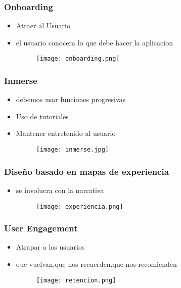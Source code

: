 \documentclass[11pt]{beamer}
\begin{document}
\begin{frame}
\frametitle{Onboarding}
\begin{itemize}
    \item Atraer al Usuario
    \item el usuario conocera lo que debe hacer la aplicacion 
     \begin{figure}
        \texttt{[image: onboarding.png]}
        \label{fig:my_label}
    \end{figure}
\end{itemize}
\end{frame}




\begin{frame}
\frametitle{Inmerse}
\begin{itemize}
    \item debemos usar funciones progresivas 
    \item Uso de tutoriales
    \item Mantener entretenido al usuario
     \begin{figure}
        \texttt{[image: inmerse.jpg]}
        \label{fig:my_label}
    \end{figure}
\end{itemize}
\end{frame}



\begin{frame}
\frametitle{Diseño basado en mapas de experiencia}
\begin{itemize}
    \item se involucra con la narrativa
     \begin{figure}
        \texttt{[image: experiencia.png]}
        \label{fig:my_label}
    \end{figure}
\end{itemize}
\end{frame}




\begin{frame}
\frametitle{User Engagement}
\begin{itemize}
    \item Atrapar a los usuarios
    \item que vuelvan,que nos recuerden,que nos recomienden
    \begin{figure}
        \texttt{[image: retencion.png]}
        \label{fig:my_label}
    \end{figure}
\end{itemize}
\end{frame}
\end{document}
